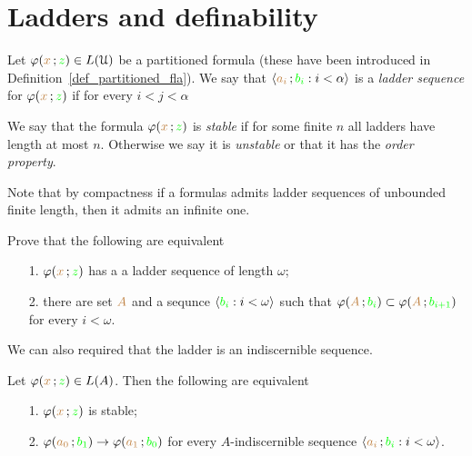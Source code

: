 \documentclass[creche.tex]{subfiles}
\begin{document}
\section{Ladders and definability}



Let $\varphi({\color{brown} x}\,;{\color{green} z})\in L(\EuScript U)$ be a partitioned formula (these have been introduced in Definition~\ref{def_partitioned_fla}).
We say that $\langle{\color{brown}a_i}\,;{\color{green} b_i} : i<\alpha\rangle$ is a \emph{ladder sequence\/} for $\varphi({\color{brown} x}\,;{\color{green} z})$ if for every $i<j<\alpha$



We say that the formula $\varphi({\color{brown} x}\,;{\color{green} z})$ is \emph{stable\/} if for some finite $n$ all ladders have length at most $n$. Otherwise we say it is \emph{unstable} or that it has the \emph{order property}.

Note that by compactness if a formulas admits ladder sequences of unbounded finite length, then it admits an infinite one.

\begin{exercise}
   Prove that the following are equivalent
   \begin{itemize}
   \item[1.]  $\varphi({\color{brown} x}\,;{\color{green} z})$ has a a ladder sequence of length $\omega$;
   \item[2.] there are set ${\color{brown} A}$ and a sequnce $\langle{\color{green}b_i} : i<\omega\rangle$ such that $\varphi({\color{brown} A}\,;{\color{green} b_i})\subset\varphi({\color{brown} A}\,;{\color{green} b_{i+1}})$ for every $i<\omega$.\QED
   \end{itemize}
\end{exercise}

We can also required that the ladder is an indiscernible sequence. 

\begin{theorem}\label{thm_sability_indiscernibility}
  Let $\varphi({\color{brown} x}\,;{\color{green} z})\in L(A)$.
  Then the following are equivalent
  \begin{itemize}
    \item[1.] $\varphi({\color{brown} x}\,;{\color{green} z})$ is stable;
    \item[2.] $\varphi({\color{brown} a_0}\,;{\color{green} b_1})\rightarrow\varphi({\color{brown} a_1}\,;{\color{green} b_0})$ for every $A$-indiscernible sequence $\langle{\color{brown}a_i}\,;{\color{green} b_i} : i<\omega\rangle$.
  \end{itemize}
\end{theorem}
\end{document}
